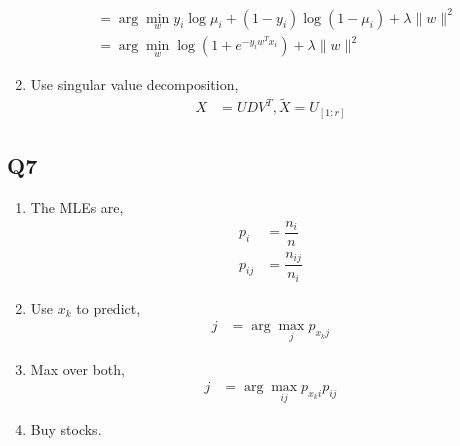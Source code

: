 \documentclass{article}
\begin{document}
\begin{enumerate}
\begin{align*}
\\ &= \arg\displaystyle\min_{w} y_{i} \log \mu_{i} + \left(1 - y_{i}\right) \log \left(1 - \mu_{i}\right) + \lambda \| w \|^{2}
\\ &= \arg\displaystyle\min_{w} \log\left(1 + e^{- y_{i} w^{T} x_{i}}\right) + \lambda \| w \|^{2}
\end{align*}
\item Use singular value decomposition,
\begin{align*}
X  &= U D V^{T}, \tilde{X} = U_{\left[1:r\right]}
\end{align*}
\end{enumerate}


\subsection{Q7}
\begin{enumerate}
\item The MLEs are,
\begin{align*}
p_{i} &= \dfrac{n_{i}}{n}
\\ p_{ij} &= \dfrac{n_{ij}}{n_{i}}
\end{align*}
\item Use $x_{k}$ to predict,
\begin{align*}
j  &= \arg\displaystyle\max_{j} p_{x_{k} j}
\end{align*}
\item Max over both,
\begin{align*}
j  &= \arg\displaystyle\max_{i j} p_{x_{k} i} p_{i j}
\end{align*}
\item Buy stocks.
\end{enumerate}
\end{document}
